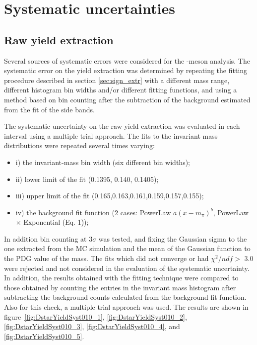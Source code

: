\clearpage
\section{Systematic uncertainties}

\subsection{Raw yield extraction}
\label{sec:raw_yield_syst}
Several sources of systematic errors were considered for the \Dstar -meson analysis. The systematic error on the yield extraction was determined by repeating the fitting procedure described in section \ref{sec:sign_extr} with a different mass range, different histogram bin widths and/or different fitting functions, and using a method based on bin counting after the subtraction of the background estimated from the fit of the side bands.%

The systematic uncertainty on the raw yield extraction was evaluated in each \pt interval using a multiple trial approach. The fits to the invariant mass distributions were repeated several times varying:
\begin{itemize}
	\item i) the invariant-mass bin width (six different bin widths);
	\item ii) lower limit of the fit (0.1395, 0.140, 0.1405);
	\item iii) upper  limit  of  the  fit (0.165,0.163,0.161,0.159,0.157,0.155);
	\item iv) the background fit function (2 cases: PowerLaw $a(x - m_\pi)^b$, PowerLaw $\times$ Exponential (Eq. 1));
\end{itemize}  

In addition bin counting at 3$\sigma$ was tested, and fixing the Gaussian sigma to the one extracted from the MC simulation and the mean of the Gaussian function to the PDG value of the \Dstar mass. The fits which did not converge or had $\chi^2$/$ndf> $ 3.0 were rejected and not considered in the evaluation of the systematic uncertainty.  In addition, the results obtained with the fitting technique were compared to those obtained by counting the entries in the invariant mass histogram after subtracting the background counts calculated from the background fit function. Also for this check, a multiple trial approach was used. 
The results are shown in figure~\ref{fig:DstarYieldSyst010_1}, \ref{fig:DstarYieldSyst010_2}, \ref{fig:DstarYieldSyst010_3}, \ref{fig:DstarYieldSyst010_4}, and \ref{fig:DstarYieldSyst010_5}. 

